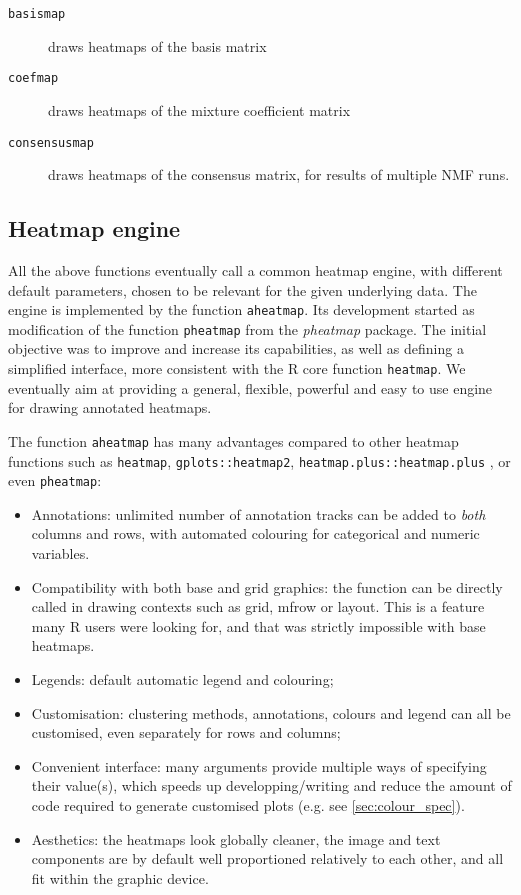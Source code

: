 \documentclass[a4paper]{article}\usepackage{graphicx, color}
\let\code=\texttt
\newcommand{\pkgname}[1]{\textit{#1}\xspace}
\begin{document}
\begin{description}
\item[\code{basismap}] draws heatmaps of the basis matrix 
\item[\code{coefmap}] draws heatmaps of the mixture coefficient matrix
\item[\code{consensusmap}] draws heatmaps of the consensus matrix, for results 
of multiple NMF runs.
\end{description}

\subsection{Heatmap engine}

All the above functions eventually call a common heatmap engine, with 
different default parameters, chosen to be relevant for the given underlying data.
The engine is implemented by the function \code{aheatmap}. 
Its development started as modification of the function \code{pheatmap} from 
the \pkgname{pheatmap} package. 
The initial objective was to improve and increase its capabilities, as well as 
defining a simplified interface, more consistent with the R core function \code{heatmap}.
We eventually aim at providing a general, flexible, powerful and easy to use engine 
for drawing annotated heatmaps.
  
The function \code{aheatmap} has many advantages compared to other heatmap functions 
such as \code{heatmap}, \code{gplots::heatmap2}, \code{heatmap.plus::heatmap.plus} 
, or even \code{pheatmap}:

\begin{itemize}
\item Annotations: unlimited number of annotation tracks can be added to 
\emph{both} columns and rows, with automated colouring for categorical and 
numeric variables.
\item Compatibility with both base and grid graphics: the function can be 
directly called in drawing contexts such as grid, mfrow or layout.
This is a feature many R users were looking for, and that was strictly 
impossible with base heatmaps.
\item Legends: default automatic legend and colouring;
\item Customisation: clustering methods, annotations, colours and legend can all 
be customised, even separately for rows and columns;
\item Convenient interface: many arguments provide multiple ways of 
specifying their value(s), which speeds up developping/writing and reduce the 
amount of code required to generate customised plots (e.g. see
\cref{sec:colour_spec}).
\item Aesthetics: the heatmaps look globally cleaner, the image and text components 
are by default well proportioned relatively to each other, and all fit within 
the graphic device.
\end{itemize}
\end{document}
